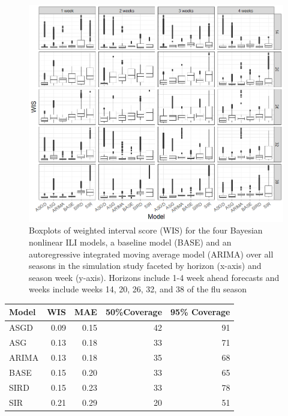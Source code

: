 \begin{figure}[hbt!]
    \centering
    \includegraphics[scale=.57]{Images/wis_by_week_horizon.png}
    \caption{Boxplots of weighted interval score (WIS) for the 
    four Bayesian nonlinear ILI models, a baseline model (BASE) and
    an autoregressive integrated moving average model (ARIMA) 
    over all seasons in the simulation study faceted by horizon 
    (x-axis) and season week (y-axis). Horizons include 1-4 week ahead forecasts 
    and weeks include weeks 14, 20, 26, 32, and 38 of the flu season}
    \label{fig:wis_by_week_horizon}
\end{figure}

\begin{table}[hbt!]
\centering
\begin{tabular}{lrrrr}
Model & WIS & MAE & 50\%Coverage  & 95\% Coverage \\ 
  \hline
ASGD & 0.09 & 0.15 & 42 & 91 \\ 
  ASG & 0.13 & 0.18 & 33 & 71 \\ 
  ARIMA & 0.13 & 0.18 & 35 & 68 \\ 
  BASE & 0.15 & 0.20 & 33 & 65 \\ 
  SIRD & 0.15 & 0.23 & 33 & 78 \\ 
  SIR & 0.21 & 0.29 & 20 & 51 \\ 
\end{tabular}
\end{table}































